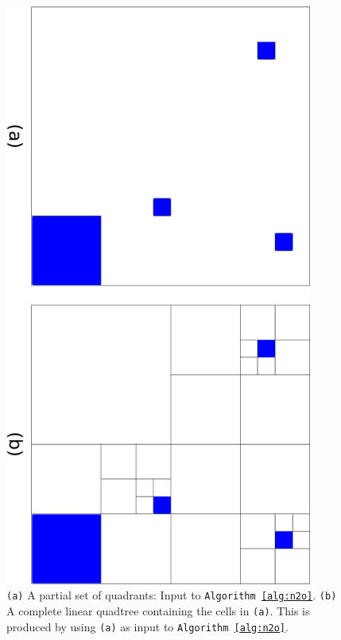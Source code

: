 \begin{figure}
  \begin{center}
    \includegraphics[angle=90, width=0.9\textwidth]{images/n2o}
    \caption{{\tt(a)} A partial set of quadrants: Input to {\tt Algorithm \ref{alg:n2o}}. {\tt(b)} A complete linear quadtree containing the cells in {\tt(a)}. This is produced by using {\tt(a)} as input to {\tt Algorithm \ref{alg:n2o}}.}
    \label{fig:n2o}
  \end{center}
\end{figure}

